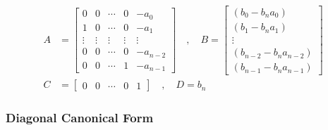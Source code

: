 \documentclass[twoside]{article}
\begin{document}
\begin{align*}
A &= \left[ \begin{array}{ccccc} 0 & 0 & \cdots & 0 & -a_0 
              \\ 1 & 0 & \cdots & 0 & -a_1 
\\ \vdots & \vdots & \vdots & \vdots & \vdots
\\ 0 & 0 & \cdots & 0 & -a_{n-2}
    \\ 0 & 0 & \cdots & 1 & -a_{n-1} \end{array} \right]
\quad , \quad 
B = \left[ \begin{array}{c} (b_0 - b_n a_0)  \\ (b_1 - b_n
             a_1 ) \\ \vdots \\ (b_{n-2} - b_n a_{n-2} ) \\   (b_{n-1} - b_n
             a_{n-1}) 
\end{array} \right]
\\ C &= \left[ \begin{array}{ccccc} 0 & 0 & \cdots &  0 & 1 \end{array} \right]
\quad , \quad
D = b_n
\end{align*}

\subsubsection*{Diagonal Canonical Form}
\end{document}
